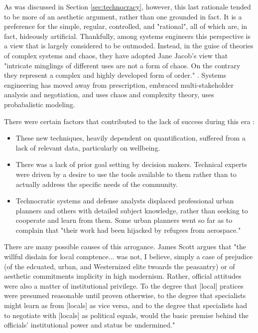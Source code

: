 As was discussed in Section \ref{sec:technocracy}, however, this last rationale tended to be more of an aesthetic argument, rather than one grounded in fact. It is a preference for the simple, regular, controlled, and "rational", all of which are, in fact, hideously artificial. Thankfully, among systems engineers this perspective is a view that is largely considered to be outmoded. Instead, in the guise of theories of complex systems and chaos, they have adopted Jane Jacob's view that "intricate minglings of different uses are not a form of chaos. On the contrary they represent a complex and highly developed form of order." \cite{jacobsDeathLifeGreat2016}. Systems engineering has moved away from prescription, embraced multi-stakeholder analysis and negotiation, and uses chaos and complexity theory, uses probabalistic modeling.

There were certain factors that contributed to the lack of success during this era \cite{lightWarfareWelfareDefense2005}:

\begin{itemize} \setlength{\itemsep}{0pt} \setlength{\parskip}{0pt} 
	\item{These new techniques, heavily dependent on quantification, suffered from a lack of relevant data, particularly on wellbeing.}
	\item{There was a lack of prior goal setting by decision makers. Technical experts were driven by a desire to use the tools available to them rather than to actually address the specific needs of the community.}
	\item{Technocratic systems and defense analysts displaced professional urban planners and others with detailed subject knowledge, rather than seeking to cooperate and learn from them. Some urban planners went so far as to complain that "their work had been hijacked by refugees from aerospace."}
\end{itemize}

There are many possible causes of this arrogance. James Scott argues that "the willful disdain for local comptence... was not, I believe, simply a case of prejudice (of the edcuated, urban, and Westernized elite twoards the peasantry) or of aesthetic commitments implicity in high modernism. Rather, official attitudes were also a matter of institutional privilege. To the degree that [local] pratices were presumed reasonable until proven otherwise, to the degree that specialists might learn as from [locals] as vice versa, and to the degree that specialists had to negotiate with [locals] as political equals, would the basic premise behind the officials' institutional power and status be undermined." \cite{scottSeeingStateHow2020}


